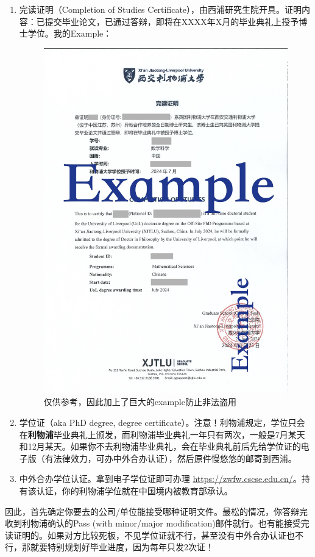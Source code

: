 \begin{enumerate}
    \item 完读证明（Completion of Studies Certificate），由西浦研究生院开具。证明内容：已提交毕业论文，已通过答辩，即将在XXXX年X月的毕业典礼上授予博士学位。我的Example：
    \begin{figure}[H]
        \centering
        \includegraphics[width=0.8\columnwidth]{author-folder/Kai.Wu/Completion_of_Studies_Certificate_EXAMPLE.jpg}
        \caption{仅供参考，因此加上了巨大的example防止非法盗用}
    \end{figure}
    \item 学位证（aka PhD degree, degree certificate）。注意！利物浦规定，学位只会在\textbf{利物浦}毕业典礼上颁发，而利物浦毕业典礼一年只有两次，一般是7月某天和12月某天。如果你不去利物浦毕业典礼，会在毕业典礼前后先给学位证的电子版（有法律效力，可办中外合办认证），然后原件慢悠悠的邮寄到西浦。
    \item 中外合办学位认证。拿到电子学位证即可办理 \url{https://zwfw.cscse.edu.cn/}。持有该认证，你的利物浦学位就在中国境内被教育部承认。
\end{enumerate}

因此，首先确定你要去的公司/单位能接受哪种证明文件。最松的情况，你答辩完收到利物浦确认的Pass (with minor/major modification)邮件就行。也有能接受完读证明的。如果对方比较死板，不见学位证就不行，甚至没有中外合办认证也不行，那就要特别规划好毕业进度，因为每年只发2次证！

